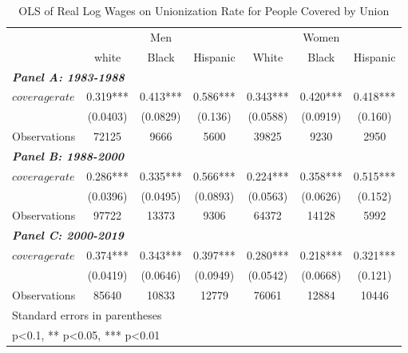 \begin{table}[h!]\centering
\def\sym#1{\ifmmode^{#1}\else\(^{#1}\)\fi}
\caption{OLS of Real Log Wages on Unionization Rate for People Covered by Union}\label{tab:ulincovrate}
\fontsize{10}{11}\selectfont
\begin{tabular}{l*{6}{c}}
\hline
&\multicolumn{3}{c}{Men}                        &\multicolumn{3}{c}{Women}                      \\\cmidrule(lr){2-4}\cmidrule(lr){5-7}
&\multicolumn{1}{c}{white}&\multicolumn{1}{c}{Black}&\multicolumn{1}{c}{Hispanic}&\multicolumn{1}{c}{White}&\multicolumn{1}{c}{Black}&\multicolumn{1}{c}{Hispanic}\\
\hline
\multicolumn{3}{l}{\linebreak \textbf{\textit{Panel A: 1983-1988}}} \\
$ coveragerate $    &       0.319***&       0.413***&       0.586***&       0.343***&       0.420***&       0.418***\\
&    (0.0403)   &    (0.0829)   &     (0.136)   &    (0.0588)   &    (0.0919)   &     (0.160)   \\
\hline
Observations        &       72125   &        9666   &        5600   &       39825   &        9230   &        2950   \\
\hline
\multicolumn{3}{l}{\linebreak \textbf{\textit{Panel B: 1988-2000}}} \\
$ coveragerate $    &       0.286***&       0.335***&       0.566***&       0.224***&       0.358***&       0.515***\\
&    (0.0396)   &    (0.0495)   &    (0.0893)   &    (0.0563)   &    (0.0626)   &     (0.152)   \\
\hline
Observations        &       97722   &       13373   &        9306   &       64372   &       14128   &        5992   \\
\hline
\multicolumn{3}{l}{\linebreak \textbf{\textit{Panel C: 2000-2019}}} \\
$ coveragerate $    &       0.374***&       0.343***&       0.397***&       0.280***&       0.218***&       0.321***\\
&    (0.0419)   &    (0.0646)   &    (0.0949)   &    (0.0542)   &    (0.0668)   &     (0.121)   \\
\hline
Observations        &       85640   &       10833   &       12779   &       76061   &       12884   &       10446   \\
\hline\hline
\multicolumn{7}{l}{\footnotesize Standard errors in parentheses}\\
\multicolumn{7}{l}{\footnotesize * p<0.1, ** p<0.05, *** p<0.01}\\
\end{tabular}
\end{table}
